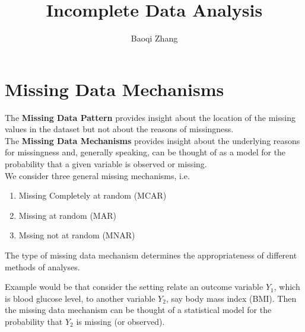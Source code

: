 \documentclass[11pt]{article}
\title{Incomplete Data Analysis}
\author{Baoqi Zhang}
\date{}
\theoremstyle{break}
\begin{document}
\maketitle
\tableofcontents
\newpage


\section{Missing Data Mechanisms}

\begin{definition}
    The \textbf{Missing Data Pattern} provides insight about the location of the
    missing values in the dataset but not about the reasons of missingness.
    \\ The \textbf{Missing Data Mechanisms} provides insight about the
    underlying reasons for missingness and, generally speaking, can be
    thought of as a model for the probability that a given variable is
    observed or missing.
    \\ We consider three general missing mechanisms, i.e.
    \begin{enumerate}
        \item Missing Completely at random (MCAR)
        \item Missing at random (MAR)
        \item Mssing not at random (MNAR)
    \end{enumerate}
    The type of missing data mechanism determines the appropriateness of
    different methods of analyses.
\end{definition}


Example would be that consider the setting relate an outcome variable $Y_1$,
which is blood glucose level, to another variable $Y_2$, say body mass index
(BMI). Then the missing data mechanism can be thought of a statistical model
for the probability that $Y_2$ is missing (or observed).
 
\end{document}
